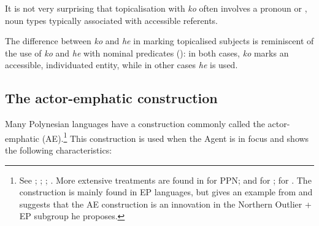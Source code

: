 It is not very surprising that topicalisation with \textit{ko} often involves a pronoun or , noun types typically associated with accessible referents.

The difference between \textit{ko} and \textit{he} in marking topicalised subjects is reminiscent of the use of \textit{ko} and \textit{he} with nominal predicates (): in both cases, \textit{ko} marks an accessible, individuated entity, while in other cases \textit{he} is used.

\subsection{The actor-emphatic construction}\label{sec:8.6.3}
Many Polynesian languages have a construction commonly called the actor-emphatic (AE).\footnote{\label{fn:428}See \citet[196–197]{Harlow2001}; \citet[175–176]{Harlow2007Maori}; \citet[147–148]{ElbertPukui1979}; \citet[62–63]{LazardPeltzer2000}. More extensive treatments are found in \citet[111–123]{Clark1976} for PPN; \citet{Waite1990} and \citet{Bauer2004} for ; \citet{PotsdamPolinsky2012} for . The construction is mainly found in EP languages, but \citet[315]{Wilson2012} gives an example from  and suggests that the AE construction is an innovation in the Northern Outlier + EP subgroup he proposes.} This construction is used when the Agent is in focus and shows the following characteristics:

